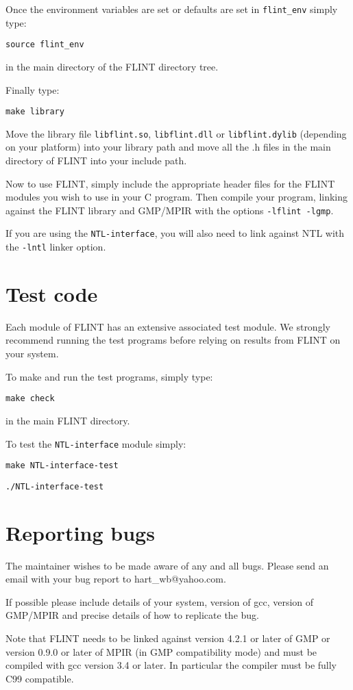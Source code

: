 \documentclass[a4paper,10pt]{article}
\newcommand{\code}{\lstinline}
\begin{document}
Once the environment variables are set or defaults are set in \code{flint_env} simply type:

\code{source flint_env}

in the main directory of the FLINT directory tree. 

Finally type:

\code{make library}

Move the library file \code{libflint.so}, \code{libflint.dll} or \code{libflint.dylib} (depending on your platform) into your library path and move all the .h files in the main directory of FLINT into your include path.

Now to use FLINT, simply include the appropriate header files for the FLINT modules you wish to use in your C program. Then compile your program, linking against the FLINT library and GMP/MPIR with the options \code{-lflint -lgmp}.

If you are using the \code{NTL-interface}, you will also need to link against NTL with the \code{-lntl} linker option.

\section{Test code}
Each module of FLINT has an extensive associated test module. We strongly recommend running the test programs before relying on results from FLINT on your system. 

To make and run the test programs, simply type:

\code{make check}

in the main FLINT directory.

To test the \code{NTL-interface} module simply:

\code{make NTL-interface-test}

\code{./NTL-interface-test}

\section{Reporting bugs}
The maintainer wishes to be made aware of any and all bugs. Please send an email with your bug report to hart\_wb@yahoo.com.

If possible please include details of your system, version of gcc, version of GMP/MPIR and precise details of how to replicate the bug.

Note that FLINT needs to be linked against version 4.2.1 or later of GMP or version 0.9.0 or later of MPIR (in GMP compatibility mode) and must be compiled with gcc version 3.4 or later. In particular the compiler must be fully C99 compatible.
\end{document}

